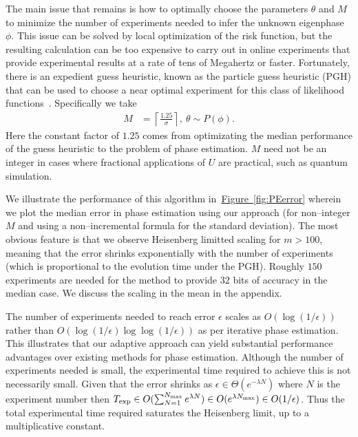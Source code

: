 \documentclass[aps,pra,amsmath,twocolumn,amssymb,superscriptaddress]{revtex4-1}
\newcommand{\eq}[1]{\hyperref[eq:#1]{(\ref*{eq:#1})}}
\newcommand{\fig}[1]{\hyperref[fig:#1]{Figure~\ref*{fig:#1}}}
\begin{document}
The main issue that remains is how to optimally choose the parameters $\theta$ and $M$ to minimize the number of experiments needed to infer the unknown eigenphase $\phi$.
This issue can be solved by local optimization of the risk function, but the resulting calculation can be too expensive to carry out in online experiments that provide experimental results at a rate of tens of Megahertz or faster.  Fortunately, there is an expedient guess heuristic, known as the particle guess heuristic (PGH) that can be used to choose a near optimal experiment for this class of likelihood functions~\cite{wiebe_hamiltonian_2014}.  Specifically we take
\begin{align}
M &= \left\lceil\frac{1.25}{\sigma}\right\rceil,~
\theta \sim P(\phi).\label{eq:PGH}
\end{align}
Here the constant factor of $1.25$ comes from optimizating the median performance of the guess heuristic to the problem of phase estimation.  
$M$ need not be an integer in cases where fractional applications of $U$ are practical, such as quantum simulation.



We illustrate the performance of this algorithm in~\fig{PEerror} wherein we plot the median error in phase estimation using our approach (for non--integer $M$ and using a non--incremental formula for the standard deviation).  The most obvious feature is that we observe Heisenberg limitted scaling for $m>100$, meaning that the error shrinks exponentially with the number of experiments (which is proportional to the evolution time under the PGH).  Roughly $150$ experiments are needed for the method to provide $32$ bits of accuracy in the median case.
We discuss the scaling in the mean in the appendix.

The number of experiments needed to reach error $\epsilon$ scales as $O(\log(1/\epsilon))$ rather than $O(\log(1/\epsilon)\log\log(1/\epsilon))$ as per iterative phase estimation.  This illustrates that our adaptive approach can yield substantial performance advantages over existing methods for phase estimation.  Although the number of experiments needed is small, the experimental time required to achieve this is not necessarily small.  Given that the error shrinks as $\epsilon\in \Theta(e^{-\lambda N})$ where $N$ is the experiment number then $T_{\exp}\in O(\sum_{N=1}^{N_{\rm max}}e^{\lambda N})\in O(e^{\lambda N_{\rm max}})\in O(1/\epsilon)$.  Thus the total experimental time required saturates the Heisenberg limit, up to a multiplicative constant.
\end{document}
